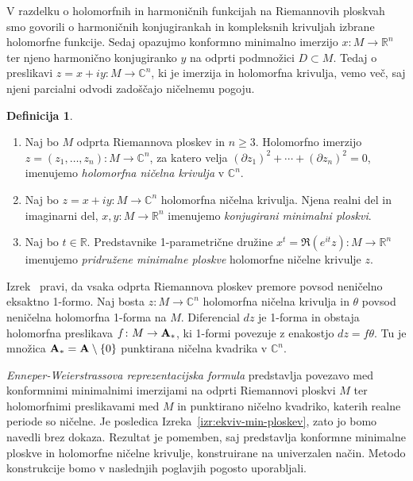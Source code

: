 \documentclass[12pt,a4paper,twoside]{article}
\theoremstyle{definition} %
\newtheorem{definicija}{Definicija}[section]
\theoremstyle{plain} %
\numberwithin{equation}{section}  %
\newcommand{\R}{\mathbb R}
\newcommand{\C}{\mathbb C}
\begin{document}
V razdelku o holomorfnih in harmoničnih funkcijah na Riemannovih ploskvah smo govorili o harmoničnih konjugirankah in kompleksnih krivuljah izbrane holomorfne funkcije. Sedaj opazujmo konformno minimalno imerzijo $x \colon M \to \mathbb{R}^{n}$ ter njeno harmonično konjugiranko $y$ na odprti podmnožici $D \subset M$. Tedaj o preslikavi $z = x + iy \colon M \to \mathbb{C}^{n}$, ki je imerzija in holomorfna krivulja, vemo več, saj njeni parcialni odvodi zadoščajo ničelnemu pogoju.
%
\begin{definicija}
\begin{enumerate}
\item
Naj bo $M$ odprta Riemannova ploskev in $n \geq 3$. Holomorfno imerzijo $z = (z_{1}, \dots , z_{n}) \colon M \to \C^{n}$, za katero velja
$(\partial{z_{1}})^2 + \cdots + (\partial{z_{n}})^2 = 0$, imenujemo \emph{holomorfna ničelna krivulja} v $\C^{n}$.
\item
Naj bo $z = x + iy \colon M \to \C^{n}$ holomorfna ničelna krivulja. Njena realni del in imaginarni del, $x, y \colon M \to \R^{n}$ imenujemo \emph{konjugirani minimalni ploskvi}.
\item
Naj bo $t \in \R$. Predstavnike 1-parametrične družine $x^{t} = \Re{(e^{it} z)} \colon M \to \R^{n}$ imenujemo \emph{pridružene minimalne ploskve} holomorfne ničelne krivulje $z$.
\end{enumerate}
\end{definicija}

Izrek~\cite[Theorem~1.10.5]{alarcon2021minimal} pravi, da vsaka odprta Riemannova ploskev premore povsod neničelno eksaktno 1-formo.
Naj bosta $z \colon M \to \mathbb{C}^{n}$ holomorfna ničelna krivulja in $\theta$ povsod neničelna holomorfna 1-forma na $M$. Diferencial $dz$ je 1-forma in obstaja holomorfna preslikava $f \colon M \to \textbf{\textup{A}}_{*}$, ki 1-formi povezuje z enakostjo $dz = f \theta$. Tu je množica $\textbf{\textup{A}}_{*} = \textbf{\textup{A}} \setminus \{0\}$ punktirana ničelna kvadrika v $\C^{n}$.

\emph{Enneper-Weierstrassova reprezentacijska formula} predstavlja povezavo med konformnimi minimalnimi imerzijami na odprti Riemannovi ploskvi $M$ ter holomorfnimi preslikavami med $M$ in punktirano ničelno kvadriko, katerih realne periode so ničelne. Je posledica Izreka~\ref{izr:ekviv-min-ploskev}, zato jo bomo navedli brez dokaza. Rezultat je pomemben, saj predstavlja konformne minimalne ploskve in holomorfne ničelne krivulje, konstruirane na univerzalen način. Metodo konstrukcije bomo v naslednjih poglavjih pogosto uporabljali.
\end{document}
